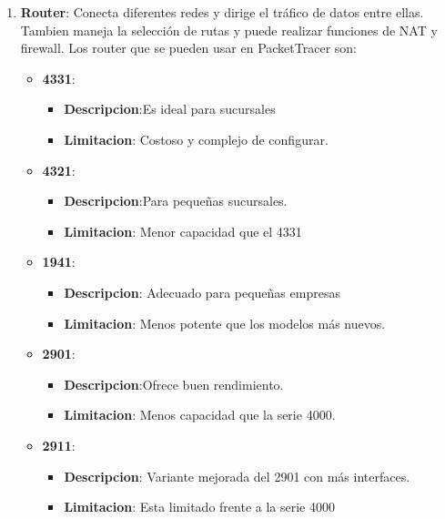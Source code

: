 \documentclass{article}
\begin{document}
        \begin{enumerate}
            \item\textbf{Router}: Conecta diferentes redes y dirige el tráfico de datos entre ellas. Tambien maneja la selección de rutas y puede realizar funciones de NAT y firewall. Los router que se pueden usar en PacketTracer son:
            \begin{itemize}
                \item\textbf{4331}:
                 \begin{itemize}
                    \item \textbf{Descripcion}:Es ideal para sucursales
                    \item \textbf{Limitacion}: Costoso y complejo de configurar.
                \end{itemize}
                \item\textbf{4321}: 
                 \begin{itemize}
                    \item \textbf{Descripcion}:Para pequeñas sucursales.
                    \item \textbf{Limitacion}: Menor capacidad que el 4331
                \end{itemize}
                \item\textbf{1941}:
                 \begin{itemize}
                    \item \textbf{Descripcion}: Adecuado para pequeñas empresas
                    \item \textbf{Limitacion}: Menos potente que los modelos más nuevos.
                \end{itemize}
                \item\textbf{2901}:
                 \begin{itemize}
                    \item \textbf{Descripcion}:Ofrece buen rendimiento.
                    \item \textbf{Limitacion}: Menos capacidad que la serie 4000.
                \end{itemize}
                \item\textbf{2911}:
                 \begin{itemize}
                    \item \textbf{Descripcion}: Variante mejorada del 2901 con más interfaces.
                    \item \textbf{Limitacion}: Esta limitado frente a la serie 4000

\end{itemize}
\end{itemize}
\end{enumerate}
\end{document}
